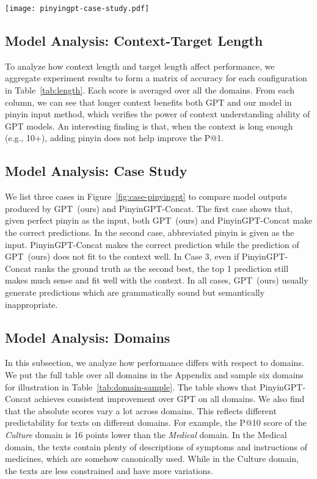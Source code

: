 \begin{figure*}[t]
  \centering
  \texttt{[image: pinyingpt-case-study.pdf]}
  \caption{Case study for GPT~(ours) and PinyinGPT-Concat in both perfect pinyin and abbreviated pinyin.}
  \label{fig:case-pinyingpt}
\end{figure*}


\subsection{Model Analysis: Context-Target Length}
To analyze how context length and target length affect performance, we aggregate experiment results to form a matrix of accuracy for each configuration in Table~\ref{tab:length}.
Each score is averaged over all the domains. 
From each column, we can see that longer context benefits both GPT and our model in pinyin input method, which verifies the power of context understanding ability of GPT models.
An interesting finding is that, when the context is long enough (e.g., 10+), adding pinyin does not help improve the P@1. 



\subsection{Model Analysis: Case Study}

We list three cases in Figure~\ref{fig:case-pinyingpt} to compare model outputs produced by GPT~(ours) and PinyinGPT-Concat.
The first case shows that, given perfect pinyin as the input, both GPT~(ours) and PinyinGPT-Concat make the correct predictions.
In the second case, abbreviated pinyin is given as the input. 
PinyinGPT-Concat makes the correct prediction while the prediction of GPT~(ours) does not fit to the context well.
In Case 3, even if PinyinGPT-Concat ranks the ground truth as the second best, the top 1 prediction still makes much sense and fit well with the context.
In all cases, GPT~(ours) usually generate predictions which are grammatically sound but semantically inappropriate.

\subsection{Model Analysis:  Domains}
In this subsection, we analyze how performance differs with respect to domains.
We put the full table over all domains in the Appendix and sample six domains for illustration in Table~\ref{tab:domain-sample}. 
The table shows that PinyinGPT-Concat achieves consistent improvement over GPT on all domains.
We also find that the absolute scores vary a lot across domains.
This reflects different predictability for texts on different domains. 
For example, the P@10 score of the  \emph{Culture}  domain is 16 points lower than the \emph{Medical} domain.
In the Medical domain, the texts contain plenty of descriptions of symptoms and instructions of medicines, which are somehow canonically used.
While in the Culture domain, the texts are less constrained and have more variations.


